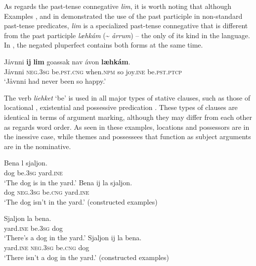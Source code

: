 \documentclass[output=paper,colorlinks,citecolor=brown]{langscibook}
\begin{document}
As regards the past-tense connegative \textit{lim}, it is worth noting that although Examples ,  and  in  demonstrated the use of the past participle in non-standard past-tense predicates, \textit{lim} is a specialized past-tense connegative that is different from the past participle \textit{læhkám} ({\textasciitilde} \textit{årrum}) – the only of its kind in the language. In , the negated pluperfect contains both forms at the same time.

\ea\label{ex:lul:18} 
    \gll Jåvnni \textbf{ij} \textbf{lim} goassak nav ávon \textbf{læhkám}. \\ 
         Jåvnni \textsc{neg.3sg} be.\textsc{pst.cng} when.\textsc{npm} so joy.\textsc{ine} be.\textsc{pst.ptcp} \\
    \glt ‘Jåvnni had never been so happy.’ \citep{SIKOR2021}
\z 

The verb \textit{liehket} ‘be’ is used in all major types of stative clauses, such as those of locational , existential  and possessive predication . 
These types of clauses are identical in terms of argument marking, although they may differ from each other as regards word order. As seen in these examples, locations and possessors are in the inessive case, while themes and possessees that function as subject arguments are in the nominative.


\ea\label{ex:lul:19} 
    \ea\label{ex:lul:19a} 
        \gll Bena l sjaljon.\\ 
          dog be.\textsc{3sg} yard.\textsc{ine}  \\
    \glt ‘The dog is in the yard.’ 
    \ex\label{ex:lul:19b} 
        \gll Bena ij la sjaljon. \\ 
          dog \textsc{neg.3sg} be.\textsc{cng} yard.\textsc{ine} \\
    \glt ‘The dog isn’t in the yard.’ (constructed examples)
    \z
\z 

\ea\label{ex:lul:20}
    \ea\label{ex:lul:20a}
        \gll Sjaljon la bena. \\ 
             yard.\textsc{ine} be.\textsc{3sg} dog  \\
        \glt  ‘There’s a dog in the yard.’ 
    \ex\label{ex:lul:20b}
        \gll Sjaljon ij la bena.  \\ 
             yard.\textsc{ine} \textsc{neg.3sg} be.\textsc{cng} dog \\
        \glt ‘There isn’t a dog in the yard.’  (constructed examples)
    \z
\z 
 
\end{document}
